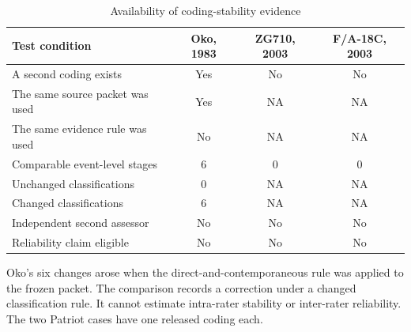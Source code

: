 \begin{table}[t]
\centering
\begin{threeparttable}
\caption{Availability of coding-stability evidence}
\label{tab:coding-stability}
\begin{tabularx}{\linewidth}{X c c c}
\toprule
Test condition & Oko, 1983 & ZG710, 2003 & F/A-18C, 2003 \\
\midrule
A second coding exists & Yes & No & No \\
The same source packet was used & Yes & NA & NA \\
The same evidence rule was used & No & NA & NA \\
Comparable event-level stages & 6 & 0 & 0 \\
Unchanged classifications & 0 & NA & NA \\
Changed classifications & 6 & NA & NA \\
Independent second assessor & No & No & No \\
Reliability claim eligible & No & No & No \\
\bottomrule
\end{tabularx}
\begin{tablenotes}[flushleft]\footnotesize
\item Oko's six changes arose when the direct-and-contemporaneous rule was applied to the frozen packet. The comparison records a correction under a changed classification rule. It cannot estimate intra-rater stability or inter-rater reliability. The two Patriot cases have one released coding each.
\end{tablenotes}
\end{threeparttable}
\end{table}
